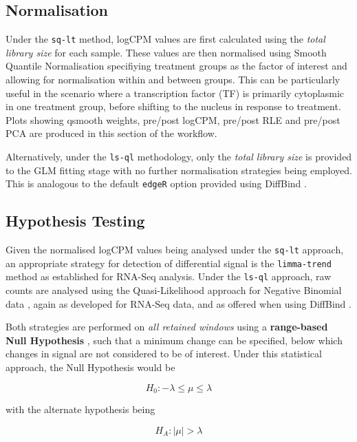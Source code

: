 \documentclass[
]{book}
\begin{document}
\hypertarget{normalisation}{%
\subsection*{Normalisation}\label{normalisation}}

Under the \texttt{sq-lt} method, logCPM values are first calculated using the \emph{total library size} for each sample.
These values are then normalised using Smooth Quantile Normalisation\citep{qsmooth} specifiying treatment groups as the factor of interest and allowing for normalisation within and between groups.
This can be particularly useful in the scenario where a transcription factor (TF) is primarily cytoplasmic in one treatment group, before shifting to the nucleus in response to treatment.
Plots showing qsmooth weights, pre/post logCPM, pre/post RLE \citep{rle} and pre/post PCA are produced in this section of the workflow.

Alternatively, under the \texttt{ls-ql} methodology, only the \emph{total library size} is provided to the GLM fitting stage with no further normalisation strategies being employed.
This is analogous to the default \texttt{edgeR} option provided using DiffBind \citep{diffbind}.

\hypertarget{hypothesis-testing}{%
\subsection*{Hypothesis Testing}\label{hypothesis-testing}}

Given the normalised logCPM values being analysed under the \texttt{sq-lt} approach, an appropriate strategy for detection of differential signal is the \texttt{limma-trend} method \citep{voom} as established for RNA-Seq analysis.
Under the \texttt{ls-ql} approach, raw counts are analysed using the Quasi-Likelihood approach for Negative Binomial data \citep{qlf}, again as developed for RNA-Seq data, and as offered when using DiffBind \citep{diffbind}.

Both strategies are performed on \emph{all retained windows} using a \textbf{range-based Null Hypothesis} \citep{treat}, such that a minimum change can be specified, below which changes in signal are not considered to be of interest.
Under this statistical approach, the Null Hypothesis would be

\[
H_0: -\lambda \leq \mu \leq \lambda
\]

with the alternate hypothesis being

\[
H_A: |\mu| > \lambda
\]
\end{document}

